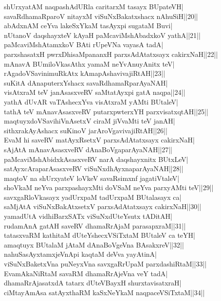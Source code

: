 \documentclass{article}
\begin{document}
shUrxyatAM naqpashAdURla caritarxM tasayx BUpateVH|\\
savaRdhamaRparoV nitayxM viSuNxBakatxshacx nAhuSiH||20||\\
abAdxnAM ceYva lakeSxYkaM tasAyxpi sugataM Buvi|\\
nUtanoV daqshayxteV kAyaH paMcaviMshAbadxkoV yathA||21||\\
paMcaviMshAtamxkoV BAti rUpeVNa vayasA tadA|\\
parxshasatxH pwrxDhisaMpananxH parxsAdAtatxsayx cakirxNaH||22||\\
mAnavA BUmiloVkasAthx yamaM neYvAnuyAnitx teV|\\
rAgadoVSavinimuRkAtx kAmapAshavivajiRtAH||23||\\
suKitA dAnaputerxYshacx savaRdhamaRparAyaNAH|\\
visAtxraM teV janAsasxveRV saMtatAyxpi gatA naqpa||24||\\
yathA dUvAR vaTAshecxYva visAtxraM yAMti BUtaleV|\\
tathA teV mAnavAsasxveRV putarxpwterxYH parxvisatxqtAH||25||\\
maqtuyxdoVSavihiVnAsetxV ciraM jiVvaMti teV janAH|\\
sithxrakAyAshacx suKinoV jarAroVgavivajiRtAH||26||\\
EvaM hi saveRV matAyxRsetxV parxsAdAtatxsayx cakirxNaH|\\
sAjAtA mAnavAsasxveRV dAnaBoVgaparAyaNAH||27||\\
paMcaviMshAbidxkAsasxveRV narA daqshayxnitx BUtxLeV|\\
satAyxcAraparAsasxveRV viSuNxdhAyxnaparAyaNAH||28||\\
maqtoV na shUrxyateV loVkeV savaRsimxnf jagatiVtaleV|\\
shoVkaM neYva parxpashayxMti doVSaM neYva parxyAMti teV||29||\\
savxgaRloVkasayx yadUrxpaM tadUrxpaM BUtalasayx ca|\\
saMjAtA viSuNxBakAtxsetxV parxsAdAtatxsayx cakirxNaH||30||\\
yamadUtA vidhiBarxSATx viSuNxdUteYsutx tADitAH|\\
rudamAnA gatAH saveRV dhamaRrAjaM parasapxraM||31||\\
tatasxvaRM kathitaM dUteYshecxVSiTxtaM BUtaleV ca teYH|\\
amaqtuyx BUtalaM jAtaM dAnaBoVgeVna BAsakxreV||32||\\
nahuSasAyxtamxjeVnApi kaqtaM deVva yayAtinA|\\
viSuNxBaketxVna puNeyxVna savxgaRrUpaM parxdashiRtaM||33||\\
EvamAkaNiRtaM savaRM dhamaRrAjeVna veY tadA|\\
dhamaRrAjasatxdA tatarx dUteVBayxH shurxtavisatxraH|\\
ciMtayAmAsa satAyxthaRM kaSxNeYkaM naqpaceVSiTxtaM||34||
\end{document}
